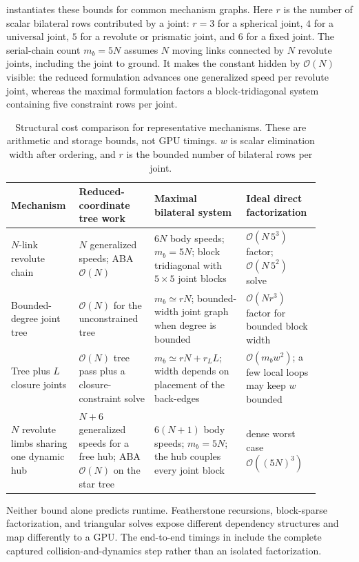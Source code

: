 \documentclass{article}
\theoremstyle{plain}
\theoremstyle{definition}
\begin{document}
 instantiates these bounds for common
mechanism graphs. Here $r$ is the number of scalar bilateral rows contributed
by a joint: $r=3$ for a spherical joint, $4$ for a universal joint, $5$ for a
revolute or prismatic joint, and $6$ for a fixed joint. The serial-chain count
$m_b=5N$ assumes $N$ moving links connected by $N$ revolute joints, including
the joint to ground. It makes the constant hidden by $\mathcal O(N)$ visible:
the reduced formulation advances one generalized speed per revolute joint,
whereas the maximal formulation factors a block-tridiagonal system containing
five constraint rows per joint.

\begin{table}[t]
\centering
\caption{Structural cost comparison for representative mechanisms. These are
arithmetic and storage bounds, not GPU timings. $w$ is scalar elimination width
after ordering, and $r$ is the bounded number of bilateral rows per joint.}
\label{tab:coordinate-complexity}
\scriptsize
\begin{tabular}{p{0.19\linewidth}p{0.23\linewidth}p{0.28\linewidth}p{0.19\linewidth}}
\toprule
Mechanism & Reduced-coordinate tree work & Maximal bilateral system & Ideal direct factorization \\
\midrule
$N$-link revolute chain
  & $N$ generalized speeds; ABA $\mathcal O(N)$
  & $6N$ body speeds; $m_b=5N$; block tridiagonal with $5\times5$ joint blocks
  & $\mathcal O(N\,5^3)$ factor; $\mathcal O(N\,5^2)$ solve \\
Bounded-degree joint tree
  & $\mathcal O(N)$ for the unconstrained tree
  & $m_b\simeq rN$; bounded-width joint graph when degree is bounded
  & $\mathcal O(Nr^3)$ factor for bounded block width \\
Tree plus $L$ closure joints
  & $\mathcal O(N)$ tree pass plus a closure-constraint solve
  & $m_b\simeq rN+r_L L$; width depends on placement of the back-edges
  & $\mathcal O(m_bw^2)$; a few local loops may keep $w$ bounded \\
$N$ revolute limbs sharing one dynamic hub
  & $N+6$ generalized speeds for a free hub; ABA $\mathcal O(N)$ on the star tree
  & $6(N+1)$ body speeds; $m_b=5N$; the hub couples every joint block
  & dense worst case $\mathcal O((5N)^3)$ \\
\bottomrule
\end{tabular}
\end{table}

Neither bound alone predicts runtime. Featherstone recursions, block-sparse
factorization, and triangular solves expose different dependency structures and
map differently to a GPU. The end-to-end timings in
 include the complete captured
collision-and-dynamics step rather than an isolated factorization.
\end{document}
